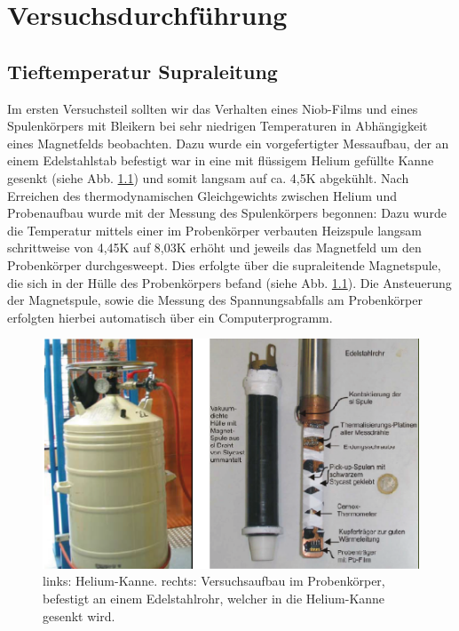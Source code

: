 \chapter{Versuchsdurchführung}
\section{Tieftemperatur Supraleitung}
Im ersten Versuchsteil sollten wir das Verhalten eines Niob-Films und eines Spulenkörpers mit Bleikern bei sehr niedrigen Temperaturen in Abhängigkeit eines Magnetfelds beobachten. Dazu wurde ein vorgefertigter Messaufbau, der an einem Edelstahlstab befestigt war in eine mit flüssigem Helium gefüllte Kanne  gesenkt (siehe Abb. \ref{tieftemp_aufbau}) und somit langsam auf ca. 4,5K abgekühlt. Nach Erreichen des thermodynamischen Gleichgewichts zwischen Helium und Probenaufbau wurde mit der Messung des Spulenkörpers begonnen: Dazu wurde die Temperatur mittels einer im Probenkörper verbauten Heizspule langsam schrittweise von 4,45K auf 8,03K erhöht und jeweils das Magnetfeld um den Probenkörper durchgesweept. Dies erfolgte über die supraleitende Magnetspule, die sich in der Hülle des Probenkörpers befand (siehe Abb. \ref{tieftemp_aufbau}). Die Ansteuerung der Magnetspule, sowie die Messung des Spannungsabfalls am Probenkörper erfolgten hierbei automatisch über ein Computerprogramm. 


\begin{figure}[H]
	\begin{center}
		\includegraphics[width=15cm]{tieftemp_aufbau}
		\caption{links: Helium-Kanne. rechts: Versuchsaufbau im Probenkörper, befestigt an einem Edelstahlrohr, welcher in die Helium-Kanne gesenkt wird.}
		\label{tieftemp_aufbau}
	\end{center}
\end{figure}

